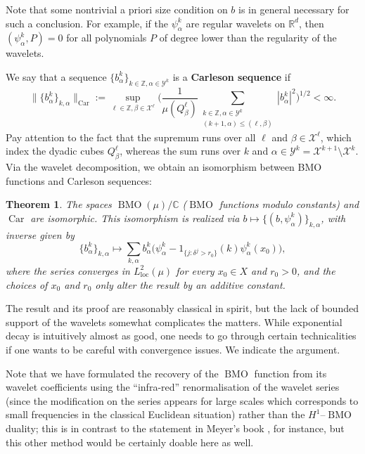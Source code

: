 \documentclass{amsart}
\numberwithin{equation}{section}
\theoremstyle{plain}
\newtheorem{theorem}[equation]{Theorem}
\theoremstyle{definition}
\theoremstyle{remark}
\begin{document}
{{{Note that some nontrivial a priori size condition on $b$ is in general necessary for such a conclusion. For example, if the $\psi^k_\alpha$ are regular wavelets on ${\mathbb{R}}^d$, then $(\psi^k_\alpha,P)=0$ for all polynomials $P$ of degree lower than the regularity of the wavelets.
  
We say that a sequence $\{b^k_\alpha\}_{k\in{\mathbb{Z}},\alpha\in\mathscr{Y}^k}$ is a \textbf{Carleson sequence} if
\begin{equation*}
  {\|{\{b^k_\alpha\}_{k,\alpha}}\|_{{\operatorname{Car}}}}
  :=\sup_{\ell\in{\mathbb{Z}},\beta\in\mathscr{X}^{\ell}}
  \Big(\frac{1}{\mu(Q^\ell_\beta)}\sum_{\substack{k\in{\mathbb{Z}},\alpha\in\mathscr{Y}^k\\(k+1,\alpha)\leq(\ell,\beta)}}{|{b^k_\alpha}|}^2\Big)^{1/2}<\infty.
\end{equation*}
Pay attention to the fact that the supremum runs over all $\ell$ and $\beta\in\mathscr{X}^{\ell}$, which index the dyadic cubes $Q^{\ell}_{\beta}$, whereas the sum runs over $k$ and $\alpha\in\mathscr{Y}^k=\mathscr{X}^{k+1}\setminus\mathscr{X}^k$. Via the wavelet decomposition, we obtain an isomorphism between BMO functions and Carleson sequences:

\begin{theorem}\label{th:BMO}
The spaces ${\operatorname{BMO}}(\mu)/{\mathbb{C}}$ (${\operatorname{BMO}}$ functions modulo constants) and $\operatorname{Car}$ are isomorphic. This isomorphism is realized via $b\mapsto\{(b,\psi^k_\alpha)\}_{k,\alpha}$, with inverse given by
\begin{equation}\label{eq:expandBMO}
  \{b^k_\alpha\}_{k,\alpha}\mapsto
   \sum_{k,\alpha}b^k_\alpha\Big(\psi^k_\alpha-1_{\{j:\delta^j>r_0\}}(k)\psi^k_\alpha(x_0)\Big),
\end{equation}
where the series converges in $L^2_{\operatorname{loc}}(\mu)$ for every $x_0\in X$ and $r_0>0$, and the choices of $x_0$ and $r_0$ only alter the result by an additive constant.
\end{theorem}

 

The result and its proof are reasonably classical in spirit, but the lack of bounded support of the wavelets somewhat complicates the matters. While exponential decay is intuitively almost as good, one needs to go through certain technicalities if one wants to be careful with convergence issues. We indicate the argument. 

Note that we have formulated the recovery of the ${\operatorname{BMO}}$ function from its wavelet coefficients using the ``infra-red'' renormalisation of the wavelet series (since the modification on the series appears for large scales which corresponds to small frequencies in the classical Euclidean situation) rather than 
the $H^1$--${\operatorname{BMO}}$ duality; this is in contrast to the statement in Meyer's book \cite{M2}, for instance, but this other method would be  certainly doable here as well.

}}}
\end{document}
